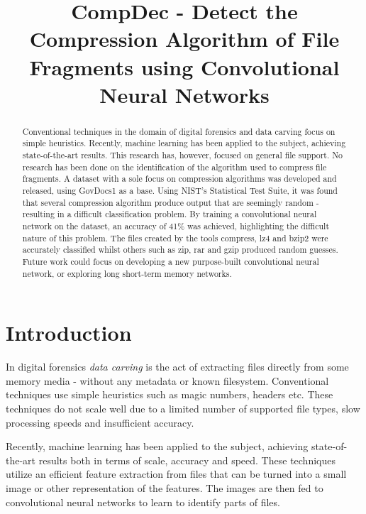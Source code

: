 \documentclass[conference]{IEEEtran}
\begin{document}
\title{CompDec - Detect the Compression Algorithm of File Fragments using Convolutional Neural Networks}

\author{
}

\maketitle

\begin{abstract}
    Conventional techniques in the domain of digital forensics and data carving focus on simple heuristics. Recently, machine learning has been applied to the subject, achieving state-of-the-art results. This research has, however, focused on general file support. No research has been done on the identification of the algorithm used to compress file fragments. A dataset with a sole focus on compression algorithms was developed and released, using GovDocs1 as a base. Using NIST's Statistical Test Suite, it was found that several compression algorithm produce output that are seemingly random - resulting in a difficult classification problem. By training a convolutional neural network on the dataset, an accuracy of 41\% was achieved, highlighting the difficult nature of this problem. The files created by the tools compress, lz4 and bzip2 were accurately classified whilst others such as zip, rar and gzip produced random guesses. Future work could focus on developing a new purpose-built convolutional neural network, or exploring long short-term memory networks.
\end{abstract}

\section{Introduction}

In digital forensics \textit{data carving} is the act of extracting files directly from some memory media - without any metadata or known filesystem. Conventional techniques use simple heuristics such as magic numbers, headers etc. These techniques do not scale well due to a limited number of supported file types, slow processing speeds and insufficient accuracy.

Recently, machine learning has been applied to the subject, achieving state-of-the-art results both in terms of scale, accuracy and speed. These techniques utilize an efficient feature extraction from files that can be turned into a small image or other representation of the features. The images are then fed to convolutional neural networks to learn to identify parts of files.
\end{document}
